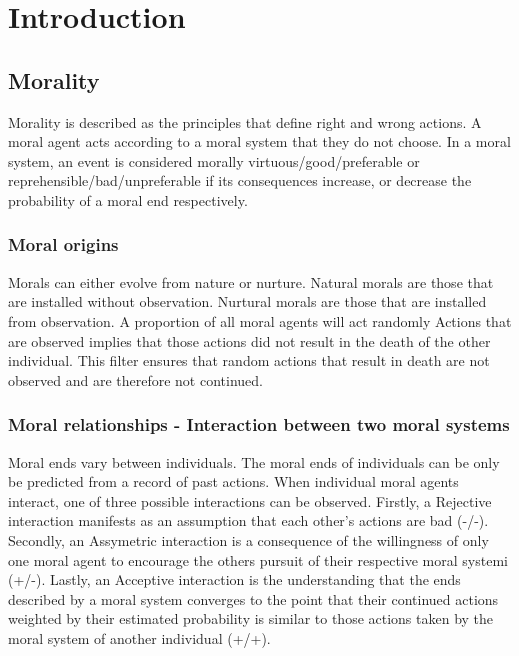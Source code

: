 \chapter{Introduction}
\section{Morality}
Morality is described as the principles that define right and wrong actions.
A moral agent acts according to a moral system that they do not choose.
In a moral system, an event is considered morally virtuous/good/preferable or reprehensible/bad/unpreferable if its consequences increase, or decrease the probability of a moral end respectively.

\subsection{Moral origins}
Morals can either evolve from nature or nurture.
Natural morals are those that are installed without observation.
Nurtural morals are those that are installed from observation.
A proportion of all moral agents will act randomly
Actions that are observed implies that those actions did not result in the death of the other individual.
This filter ensures that random actions that result in death are not observed and are therefore not continued.

\subsection{Moral relationships - Interaction between two moral systems}
Moral ends vary between individuals.
The moral ends of individuals can be only be predicted from a record of past actions.
When individual moral agents interact, one of three possible interactions can be observed.
Firstly, a Rejective interaction manifests as an assumption that each other's actions are bad (-/-). 
Secondly, an Assymetric interaction is a consequence of the willingness of only one moral agent to encourage the others pursuit of their respective moral systemi (+/-).
Lastly, an Acceptive interaction is the understanding that the ends described by a moral system converges to the point that their continued actions weighted by their estimated probability is similar to those actions taken by the moral system of another individual (+/+).

